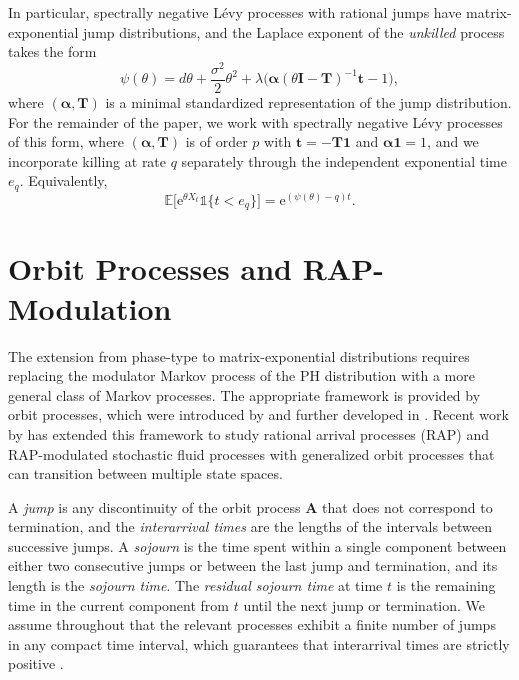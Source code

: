 \documentclass[a4paper,11pt]{article}
\numberwithin{equation}{section}
\theoremstyle{plain}
\theoremstyle{definition}
\newcommand{\1}{\mathbf{1}}
\newcommand{\e}{\mathrm{e}}
\newcommand{\EE}{\mathbb{E}}
\begin{document}
In particular, spectrally negative Lévy processes with rational jumps have matrix-exponential jump distributions, and the Laplace exponent of the \emph{unkilled} process takes the form
\begin{equation}\label{eq:psi_ME_final}
\psi(\theta) = d\theta + \frac{\sigma^2}{2}\theta^2 + \lambda\big(\bm{\alpha}(\theta \bm I - \bm{T})^{-1}\bm{t} - 1\big),
\end{equation}
where $(\bm{\alpha}, \bm{T})$ is a minimal standardized representation of the jump distribution. For the remainder of the paper, we work with spectrally negative Lévy processes of this form, where $(\bm{\alpha}, \bm{T})$ is of order $p$ with $\bm{t} = -\bm{T}\bm{1}$ and $\bm{\alpha}\bm{1} = 1$, and we incorporate killing at rate $q$ separately through the independent exponential time $e_q$. Equivalently,
\[
\EE\big[\e^{\theta X_t}\mathds{1}\{t<e_q\}\big]=\e^{(\psi(\theta)-q)t}.
\]

\section{Orbit Processes and RAP-Modulation}\label{sec:orbit_processes_and_rap_modulated_stochastic_fluid_processes}
The extension from phase-type to matrix-exponential distributions requires replacing the modulator Markov process of the PH distribution with a more general class of Markov processes. The appropriate framework is provided by orbit processes, which were introduced by \cite{AsmussenBladt1999} and further developed in \cite{bean2010quasi,BuchholzTelek2013}. Recent work by \cite{BeanNguyenNielsenPeralta2022} has extended this framework to study rational arrival processes (RAP) and RAP-modulated stochastic fluid processes with generalized orbit processes that can transition between multiple state spaces.

A \emph{jump} is any discontinuity of the orbit process $\bm{A}$ that does not correspond to termination, and the \emph{interarrival times} are the lengths of the intervals between successive jumps. A \emph{sojourn} is the time spent within a single component between either two consecutive jumps or between the last jump and termination, and its length is the \emph{sojourn time}. The \emph{residual sojourn time} at time $t$ is the remaining time in the current component from $t$ until the next jump or termination. We assume throughout that the relevant processes exhibit a finite number of jumps in any compact time interval, which guarantees that interarrival times are strictly positive \cite{AsmussenBladt1999}.
\end{document}
